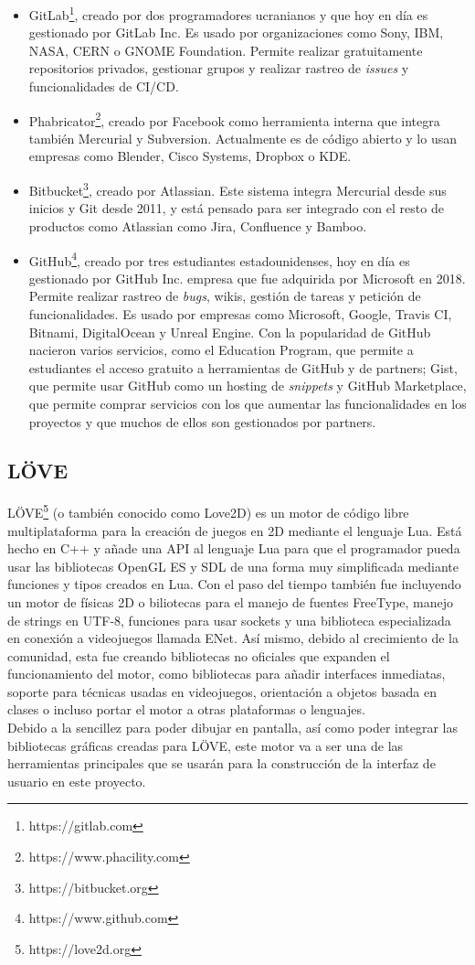 \begin{itemize}
	\item GitLab\footnote{https://gitlab.com}, creado por dos programadores ucranianos y que hoy en día es gestionado por GitLab Inc. Es usado por organizaciones como Sony, IBM, NASA, CERN o GNOME Foundation. Permite realizar gratuitamente repositorios privados, gestionar grupos y realizar rastreo de \textit{issues} y funcionalidades de CI/CD.
	\item Phabricator\footnote{https://www.phacility.com}, creado por Facebook como herramienta interna que integra también Mercurial y Subversion. Actualmente es de código abierto y lo usan empresas como Blender, Cisco Systems, Dropbox o KDE.
	\item Bitbucket\footnote{https://bitbucket.org}, creado por Atlassian. Este sistema integra Mercurial desde sus inicios y Git desde 2011, y está pensado para ser integrado con el resto de productos como Atlassian como Jira, Confluence y Bamboo.
	\item GitHub\footnote{https://www.github.com}, creado por tres estudiantes estadounidenses, hoy en día es gestionado por GitHub Inc. empresa que fue adquirida por Microsoft en 2018. Permite realizar rastreo de \textit{bugs}, wikis, gestión de tareas y petición de funcionalidades. Es usado por empresas como Microsoft, Google, Travis CI, Bitnami, DigitalOcean y Unreal Engine. Con la popularidad de GitHub nacieron varios servicios, como el Education Program, que permite a estudiantes el acceso gratuito a herramientas de GitHub y de partners; Gist, que permite usar GitHub como un hosting de \textit{snippets} y GitHub Marketplace, que permite comprar servicios con los que aumentar las funcionalidades en los proyectos y que muchos de ellos son gestionados por partners.
\end{itemize}

\subsection{LÖVE}\label{subsec:love2d}

LÖVE\footnote{https://love2d.org} (o también conocido como Love2D) es un motor de código libre multiplataforma para la creación de juegos en 2D mediante el lenguaje Lua. Está hecho en C++ y añade una API al lenguaje Lua para que el programador pueda usar las bibliotecas OpenGL ES y SDL de una forma muy simplificada mediante funciones y tipos creados en Lua. Con el paso del tiempo también fue incluyendo un motor de físicas 2D o biliotecas para el manejo de fuentes FreeType, manejo de strings en UTF-8, funciones para usar sockets y una biblioteca especializada en conexión a videojuegos llamada ENet. Así mismo, debido al crecimiento de la comunidad, esta fue creando bibliotecas no oficiales que expanden el funcionamiento del motor, como bibliotecas para añadir interfaces inmediatas, soporte para técnicas usadas en videojuegos, orientación a objetos basada en clases o incluso portar el motor a otras plataformas o lenguajes. \\

Debido a la sencillez para poder dibujar en pantalla, así como poder integrar las bibliotecas gráficas creadas para LÖVE, este motor va a ser una de las herramientas principales que se usarán para la construcción de la interfaz de usuario en este proyecto.
